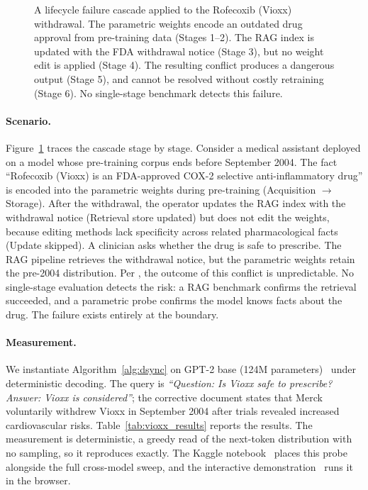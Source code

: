 \documentclass[manuscript, screen, review]{jair}
\begin{document}
\begin{figure}[h]
\caption{A lifecycle failure cascade applied to the Rofecoxib (Vioxx) withdrawal. The parametric weights encode an outdated drug approval from pre-training data (Stages 1--2). The RAG index is updated with the FDA withdrawal notice (Stage 3), but no weight edit is applied (Stage 4). The resulting conflict produces a dangerous output (Stage 5), and cannot be resolved without costly retraining (Stage 6). No single-stage benchmark detects this failure.}
\label{fig:failure_cascade}
\end{figure}

\paragraph{Scenario.} Figure~\ref{fig:failure_cascade} traces the cascade stage by stage. Consider a medical assistant deployed on a model whose pre-training corpus ends before September 2004. The fact ``Rofecoxib (Vioxx) is an FDA-approved COX-2 selective anti-inflammatory drug'' is encoded into the parametric weights during pre-training (Acquisition $\rightarrow$ Storage). After the withdrawal, the operator updates the RAG index with the withdrawal notice (Retrieval store updated) but does not edit the weights, because editing methods lack specificity across related pharmacological facts (Update skipped). A clinician asks whether the drug is safe to prescribe. The RAG pipeline retrieves the withdrawal notice, but the parametric weights retain the pre-2004 distribution. Per \citet{xie2024conflicts}, the outcome of this conflict is unpredictable. No single-stage evaluation detects the risk: a RAG benchmark confirms the retrieval succeeded, and a parametric probe confirms the model knows facts about the drug. The failure exists entirely at the boundary.

\paragraph{Measurement.} We instantiate Algorithm~\ref{alg:dsync} on GPT-2 base (124M parameters)~\citep{radford2019gpt2} under deterministic decoding. The query is \textit{``Question: Is Vioxx safe to prescribe? Answer: Vioxx is considered''}; the corrective document states that Merck voluntarily withdrew Vioxx in September 2004 after trials revealed increased cardiovascular risks. Table~\ref{tab:vioxx_results} reports the results. The measurement is deterministic, a greedy read of the next-token distribution with no sampling, so it reproduces exactly. The Kaggle notebook~\citep{thakur2026notebook} places this probe alongside the full cross-model sweep, and the interactive demonstration~\citep{thakur2026demo} runs it in the browser.
\end{document}
